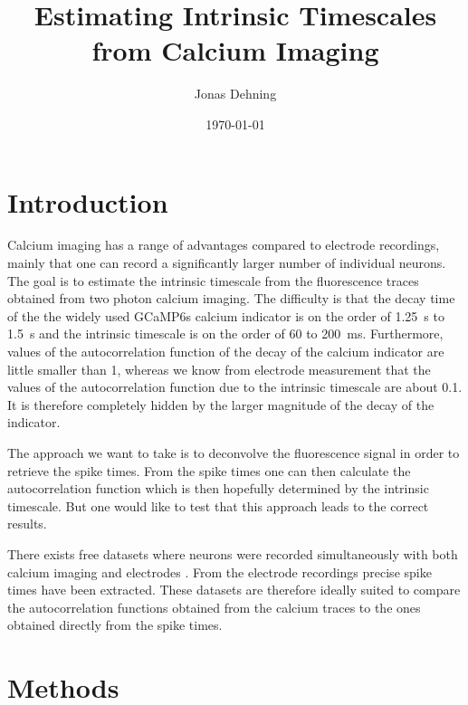 \documentclass[12pt,a4paper,headinclude]{scrartcl}
\begin{document}
\title{Estimating Intrinsic Timescales from Calcium Imaging}
\date{\today}
\author{Jonas Dehning}

\maketitle


\section{Introduction}

Calcium imaging has a range of advantages compared to electrode recordings, mainly that one can record a significantly larger number of individual neurons. The goal is to estimate the intrinsic timescale from the fluorescence traces obtained from two photon calcium imaging. The difficulty is that the decay time of the the widely used GCaMP6s calcium indicator is on the order of \SI{1.25}{s} to \SI{1.5}{s} and the intrinsic timescale is on the order of \SI{60}{} to \SI{200}{ms}. Furthermore, values of the autocorrelation function of the decay of the calcium indicator are  little smaller than 1, whereas we know from electrode measurement that the values of the autocorrelation function due to the intrinsic timescale are about 0.1. It is therefore completely hidden by the larger magnitude of the decay of the indicator.

The approach we want to take is to deconvolve the fluorescence signal in order to retrieve the spike times. From the spike times one can then calculate the autocorrelation function which is then hopefully determined by the intrinsic timescale. But one would like to test that this approach leads to the correct results.

There exists free datasets where neurons were recorded simultaneously with both calcium imaging and electrodes \cite{chen_ultrasensitive_2013,theis_benchmarking_2016}. From the electrode recordings precise spike times have been extracted. These datasets are therefore ideally suited to compare the autocorrelation functions obtained from the calcium traces to the ones obtained directly from the spike times.

\section{Methods}
\end{document}

